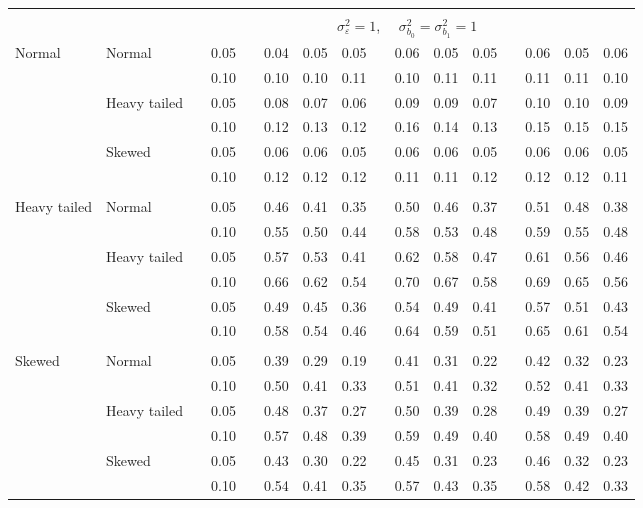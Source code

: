 \documentclass[12pt]{article} %
\begin{document}
\begin{table}[ht]
\begin{scriptsize}
\begin{center}
\begin{tabular}{ll p{.1cm} c p{.1cm} rrr p{.1cm} rrr p{.1cm} rrr}
&&&&&&&&&&&&&&&\\
& && && \multicolumn{9}{c}{$\sigma_{\varepsilon}^2 = 1$, \ \ $\sigma_{b_0}^2 = \sigma_{b_1}^2 = 1$} \\ \cline{6-16}
\rowcolor{gray!20}Normal       & Normal       && 0.05 &&   0.04 & 0.05 & 0.05 && 0.06 & 0.05 & 0.05 &&  0.06 & 0.05 & 0.06 \\
\rowcolor{gray!20}             &              && 0.10 &&   0.10 & 0.10 & 0.11 && 0.10 & 0.11 & 0.11 &&  0.11 & 0.11 & 0.10 \\
\rowcolor{gray!20}             & Heavy tailed && 0.05 &&   0.08 & 0.07 & 0.06 && 0.09 & 0.09 & 0.07 &&  0.10 & 0.10 & 0.09 \\
\rowcolor{gray!20}             &              && 0.10 &&   0.12 & 0.13 & 0.12 && 0.16 & 0.14 & 0.13 &&  0.15 & 0.15 & 0.15 \\
\rowcolor{gray!20}             & Skewed       && 0.05 &&   0.06 & 0.06 & 0.05 && 0.06 & 0.06 & 0.05 &&  0.06 & 0.06 & 0.05 \\
\rowcolor{gray!20}             &              && 0.10 &&   0.12 & 0.12 & 0.12 && 0.11 & 0.11 & 0.12 &&  0.12 & 0.12 & 0.11 \\
             &&&&&&&&&&&&&&&\\
Heavy tailed & Normal       && 0.05 &&   0.46 & 0.41 & 0.35 && 0.50 & 0.46 & 0.37 &&  0.51 & 0.48 & 0.38 \\
             &              && 0.10 &&   0.55 & 0.50 & 0.44 && 0.58 & 0.53 & 0.48 &&  0.59 & 0.55 & 0.48 \\
             & Heavy tailed && 0.05 &&   0.57 & 0.53 & 0.41 && 0.62 & 0.58 & 0.47 &&  0.61 & 0.56 & 0.46 \\
             &              && 0.10 &&   0.66 & 0.62 & 0.54 && 0.70 & 0.67 & 0.58 &&  0.69 & 0.65 & 0.56 \\
             & Skewed       && 0.05 &&   0.49 & 0.45 & 0.36 && 0.54 & 0.49 & 0.41 &&  0.57 & 0.51 & 0.43 \\
             &              && 0.10 &&   0.58 & 0.54 & 0.46 && 0.64 & 0.59 & 0.51 &&  0.65 & 0.61 & 0.54 \\
             &&&&&&&&&&&&&&&\\ 
Skewed       & Normal       && 0.05 &&   0.39 & 0.29 & 0.19 && 0.41 & 0.31 & 0.22 &&  0.42 & 0.32 & 0.23 \\
             &              && 0.10 &&   0.50 & 0.41 & 0.33 && 0.51 & 0.41 & 0.32 &&  0.52 & 0.41 & 0.33 \\
             & Heavy tailed && 0.05 &&   0.48 & 0.37 & 0.27 && 0.50 & 0.39 & 0.28 &&  0.49 & 0.39 & 0.27 \\
             &              && 0.10 &&   0.57 & 0.48 & 0.39 && 0.59 & 0.49 & 0.40 &&  0.58 & 0.49 & 0.40 \\
             & Skewed       && 0.05 &&   0.43 & 0.30 & 0.22 && 0.45 & 0.31 & 0.23 &&  0.46 & 0.32 & 0.23 \\
             &              && 0.10 &&   0.54 & 0.41 & 0.35 && 0.57 & 0.43 & 0.35 &&  0.58 & 0.42 & 0.33 \\



\end{tabular}
\end{center}
\end{scriptsize}
\end{table}
\end{document}
